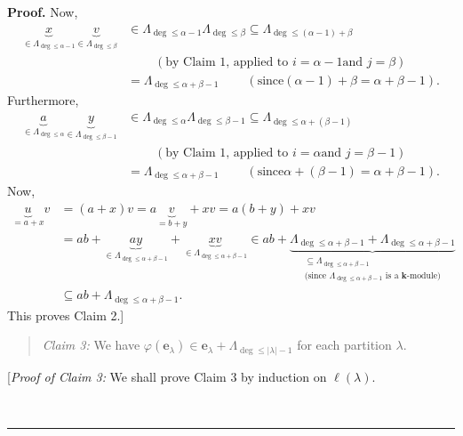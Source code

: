 \documentclass[numbers=enddot,12pt,final,onecolumn,notitlepage]{scrartcl}%
\theoremstyle{definition}
\newenvironment{statement}{\begin{quote}}{\end{quote}}
\newenvironment{proof}[1][Proof]{\noindent\textbf{#1.} }{\ \rule{0.5em}{0.5em}}
\begin{document}
\begin{proof}
Now,
\begin{align*}
\underbrace{x}_{\in\Lambda_{\deg\leq\alpha-1}}\underbrace{v}_{\in\Lambda
_{\deg\leq\beta}}  &  \in\Lambda_{\deg\leq\alpha-1}\Lambda_{\deg\leq\beta
}\subseteq\Lambda_{\deg\leq\left(  \alpha-1\right)  +\beta}\\
&  \ \ \ \ \ \ \ \ \ \ \left(  \text{by Claim 1, applied to }i=\alpha-1\text{
and }j=\beta\right) \\
&  =\Lambda_{\deg\leq\alpha+\beta-1}\ \ \ \ \ \ \ \ \ \ \left(  \text{since
}\left(  \alpha-1\right)  +\beta=\alpha+\beta-1\right)  .
\end{align*}
Furthermore,%
\begin{align*}
\underbrace{a}_{\in\Lambda_{\deg\leq\alpha}}\underbrace{y}_{\in\Lambda
_{\deg\leq\beta-1}}  &  \in\Lambda_{\deg\leq\alpha}\Lambda_{\deg\leq\beta
-1}\subseteq\Lambda_{\deg\leq\alpha+\left(  \beta-1\right)  }\\
&  \ \ \ \ \ \ \ \ \ \ \left(  \text{by Claim 1, applied to }i=\alpha\text{
and }j=\beta-1\right) \\
&  =\Lambda_{\deg\leq\alpha+\beta-1}\ \ \ \ \ \ \ \ \ \ \left(  \text{since
}\alpha+\left(  \beta-1\right)  =\alpha+\beta-1\right)  .
\end{align*}
Now,%
\begin{align*}
\underbrace{u}_{=a+x}v  &  =\left(  a+x\right)  v=a\underbrace{v}%
_{=b+y}+xv=a\left(  b+y\right)  +xv\\
&  =ab+\underbrace{ay}_{\in\Lambda_{\deg\leq\alpha+\beta-1}}+\underbrace{xv}%
_{\in\Lambda_{\deg\leq\alpha+\beta-1}}\in ab+\underbrace{\Lambda_{\deg
\leq\alpha+\beta-1}+\Lambda_{\deg\leq\alpha+\beta-1}}_{\substack{\subseteq
\Lambda_{\deg\leq\alpha+\beta-1}\\\text{(since }\Lambda_{\deg\leq\alpha
+\beta-1}\text{ is a }\mathbf{k}\text{-module)}}}\\
&  \subseteq ab+\Lambda_{\deg\leq\alpha+\beta-1}.
\end{align*}
This proves Claim 2.]

\begin{statement}
\textit{Claim 3:} We have $\varphi\left(  \mathbf{e}_{\lambda}\right)
\in\mathbf{e}_{\lambda}+\Lambda_{\deg\leq\left\vert \lambda\right\vert -1}$
for each partition $\lambda$.
\end{statement}

[\textit{Proof of Claim 3:} We shall prove Claim 3 by induction on
$\ell\left(  \lambda\right)  $.


\end{proof}
\end{document}
